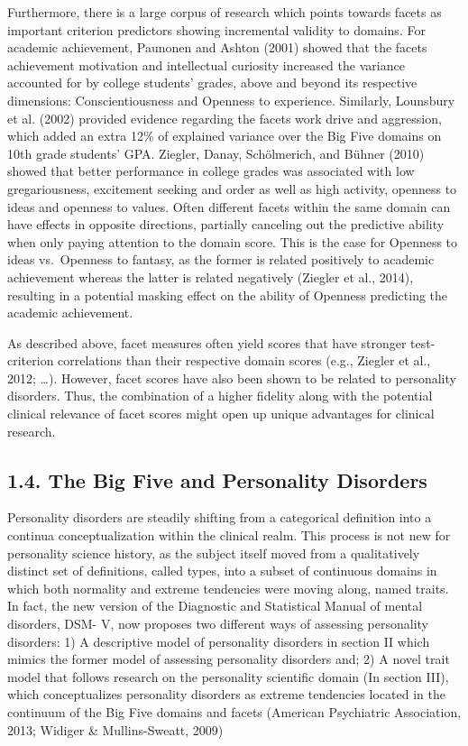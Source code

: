 \documentclass[,man,floatsintext]{apa6}
\theoremstyle{definition}
\theoremstyle{definition}
\theoremstyle{definition}
\theoremstyle{remark}
\begin{document}
Furthermore, there is a large corpus of research which points towards
facets as important criterion predictors showing incremental validity to
domains. For academic achievement, Paunonen and Ashton (2001) showed
that the facets achievement motivation and intellectual curiosity
increased the variance accounted for by college students' grades, above
and beyond its respective dimensions: Conscientiousness and Openness to
experience. Similarly, Lounsbury et al. (2002) provided evidence
regarding the facets work drive and aggression, which added an extra
12\% of explained variance over the Big Five domains on 10th grade
students' GPA. Ziegler, Danay, Schölmerich, and Bühner (2010) showed
that better performance in college grades was associated with low
gregariousness, excitement seeking and order as well as high activity,
openness to ideas and openness to values. Often different facets within
the same domain can have effects in opposite directions, partially
canceling out the predictive ability when only paying attention to the
domain score. This is the case for Openness to ideas vs.~Openness to
fantasy, as the former is related positively to academic achievement
whereas the latter is related negatively (Ziegler et al., 2014),
resulting in a potential masking effect on the ability of Openness
predicting the academic achievement.

As described above, facet measures often yield scores that have stronger
test-criterion correlations than their respective domain scores (e.g.,
Ziegler et al., 2012; \ldots{}). However, facet scores have also been
shown to be related to personality disorders. Thus, the combination of a
higher fidelity along with the potential clinical relevance of facet
scores might open up unique advantages for clinical research.

\hypertarget{the-big-five-and-personality-disorders}{%
\subsection{1.4. The Big Five and Personality
Disorders}\label{the-big-five-and-personality-disorders}}

Personality disorders are steadily shifting from a categorical
definition into a continua conceptualization within the clinical realm.
This process is not new for personality science history, as the subject
itself moved from a qualitatively distinct set of definitions, called
types, into a subset of continuous domains in which both normality and
extreme tendencies were moving along, named traits. In fact, the new
version of the Diagnostic and Statistical Manual of mental disorders,
DSM- V, now proposes two different ways of assessing personality
disorders: 1) A descriptive model of personality disorders in section II
which mimics the former model of assessing personality disorders and; 2)
A novel trait model that follows research on the personality scientific
domain (In section III), which conceptualizes personality disorders as
extreme tendencies located in the continuum of the Big Five domains and
facets (American Psychiatric Association, 2013; Widiger \&
Mullins-Sweatt, 2009)
\end{document}
